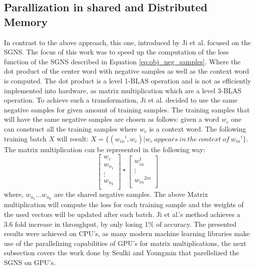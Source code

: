 \subsection{Parallization in shared and Distributed Memory}
In contrast to the above approach, this one, introduced by Ji et al. \cite{intel} focused on the SGNS. The focus of this work was to speed up the computation of the loss function of the SGNS described in Equation \ref{eq:obj_neg_samples}. Where the dot product of the center word  with negative samples as well as the context word is computed. The dot product is a level 1-BLAS operation and is not as efficiently implemented into hardware, as matrix multiplication which are a level 3-BLAS operation.  To achieve such a transformation, Ji et al. decided to use the same negative samples for given amount of training samples. The training samples that will have the same negative samples are chosen as follows: given a word $w_c$ one can construct all the training samples where $w_c$ is a context word. The following training batch $X$ will result: $X = \{({w_{in}}^i, w_c) | w_c~appears~in~the~context~of~{w_{in}}^i\}$. The matrix multiplication can be represented in the following way:
\[
\begin{bmatrix}
w_c \\
w_{n_1} \\
\vdots \\
w_{n_k}\\
\end{bmatrix}
*
\begin{bmatrix}
w_{in}^1\\
\vdots\\
{w_{in}}^{2m}\\
\end{bmatrix}
\]
where, $w_{n_1}...w_{n_k}$ are the shared negative samples. The above Matrix multiplication will compute the loss for each training sample and the weights of the used vectors will be updated after each batch. Ji et al.'s method achieves a 3.6 fold increase in throughput, by only losing 1\% of accuracy. The presented results were achieved on CPU's, as many modern machine learning libraries make use of the parallelizing capabilities of GPU's for matrix multiplications, the next subsection covers the work done by Seulki and Youngmin \cite{gpu} that parellelized the SGNS on GPU's.

